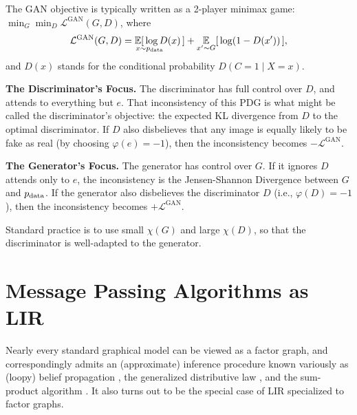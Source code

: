 The GAN objective is typically written as a 2-player minimax game:
$
    \min_{G} \min_{D}  \mathcal L^{\text{GAN}}(G,D)
$, where
\[
\mathcal L^{\text{GAN}}(G,D) = \Ex_{\vphantom{|}x \mathrlap{\sim \pdata}}
    [\, \log D(x) \, ] + \Ex_{x' \sim G} [\,\log (1- D(x')) \,],
\]
and $D(x)$ stands for the conditional probability $D(C{=}1 \mid X={x})$. 

\textbf{The Discriminator's Focus.}
The discriminator has full control over $D$, and attends to
everything but $e$.
That inconsistency of this PDG is what might be called
the discriminator's objective:
the expected KL divergence from $D$ to the optimal discriminator.
If $D$ also disbelieves that any image is equally likely to be fake as real
(by choosing $\varphi(e) = -1$),
then the inconsistency becomes $-\mathcal L^{\text{GAN}}$.

\textbf{The Generator's Focus.}
The generator has control over $G$.
If it ignores $D$ attends only to $e$, the inconsistency
is the Jensen-Shannon Divergence between $G$ and $p_{\mathrm{data}}$.
If the generator also disbelieves the discriminator $D$
(i.e., $ \varphi(D) =-1$),
then the inconsistency becomes $+\mathcal L^{\text{GAN}}$.

Standard practice is to use small $\chi(G)$ and large $\chi(D)$,
so that the discriminator is well-adapted to the generator.

\section{Message Passing Algorithms as LIR}

Nearly every standard graphical model can be viewed
    as a factor graph, and correspondingly admits an
    (approximate) inference procedure known
    variously as (loopy) belief propagation \citep{KF09},
    the generalized distributive law \citep{aji2000gendistriblaw},
    and the sum-product algorithm \citep{kschischang2001factor}.
It also turns out to be the special case of LIR specialized to factor graphs.

